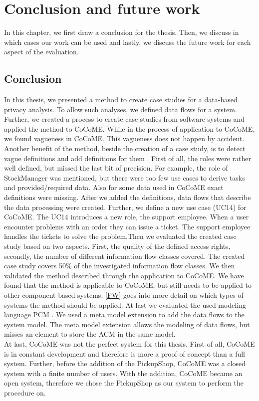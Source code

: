 
\chapter{Conclusion and future work}
\label{ch:Conclusion}
In this chapter, we first draw a conclusion for the thesis. Then, we discuss in which cases our work can be used and lastly, we discuss the future work for each aspect of the evaluation.
\section{Conclusion}
In this thesis, we presented a method to create case studies for a data-based privacy analysis. To allow such analyses, we defined data flows for a system. Further, we created a process to create case studies from software systems and applied the method to CoCoME. While in the process of application to CoCoME, we found vagueness in CoCoME. This vagueness does not happen by accident. Another benefit of the method, beside the creation of a case study, is to detect vague definitions and add definitions for them . First of all, the roles were rather well defined, but missed the last bit of precision. For example, the role of StockManager was mentioned, but there were too few use cases to derive tasks and provided/required data. Also for some data used in CoCoME exact definitions were missing. After we added the definitions, data flows that describe the data processing were created. Further, we define a new use case (UC14) for CoCoME. The UC14 introduces a new role, the support employee. When a user encounter problems with an order they can issue a ticket. The support employee handles the tickets to solve the problem.Then we evaluated the created case study based on two aspects. First, the quality of the defined access rights, secondly, the number of different information flow classes covered. The created case study  covers 50\% of the investigated information flow classes. We then validated the method described through the application to CoCoME. We have found that the method is applicable to CoCoME, but still needs to be applied to other component-based systems.  \autoref{FW} goes into more detail on which types of systems the method should be applied.  At last we evaluated the used modeling language PCM \cite{PCM}. We used a meta model extension to add the data flows to the system model. The meta model extension allows the modeling of data flows, but misses an element to store the ACM in the same model.\\
At last, CoCoME was not the perfect system for this thesis. First of all, CoCoME is in constant development and therefore is more a proof of concept than a full system. Further, before the addition of the PickupShop, CoCoME was a closed system with a finite number of users. With the addition, CoCoME became an open system, therefore we chose the PickupShop as our system to perform the procedure on.

